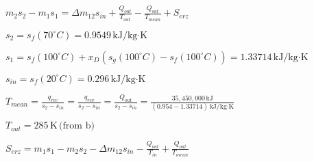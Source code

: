 \( m_2 s_2 - m_1 s_1 = \Delta m_{12} s_{in} + \frac{Q_{out}}{T_{out}} - \frac{Q_{out}}{T_{mean}} + S_{erz} \)  

\( s_2 = s_f(70^\circ C) = 0.9549 \, \text{kJ/kg·K} \)  

\( s_1 = s_f(100^\circ C) + x_D (s_g(100^\circ C) - s_f(100^\circ C)) = 1.33714 \, \text{kJ/kg·K} \)  

\( s_{in} = s_f(20^\circ C) = 0.296 \, \text{kJ/kg·K} \)  

\( T_{mean} = \frac{q_{rev}}{s_2 - s_{in}} = \frac{q_{rev}}{s_2 - s_{in}} = \frac{Q_{out}}{s_2 - s_{in}} = \frac{35,450,000 \, \text{kJ}}{(0.954 - 1.33714) \, \text{kJ/kg·K}} \)  

\( T_{out} = 285 \, \text{K} \, \text{(from b)} \)  

\( S_{erz} = m_1 s_1 - m_2 s_2 - \Delta m_{12} s_{in} - \frac{Q_{out}}{T_{in}} + \frac{Q_{out}}{T_{mean}} \)